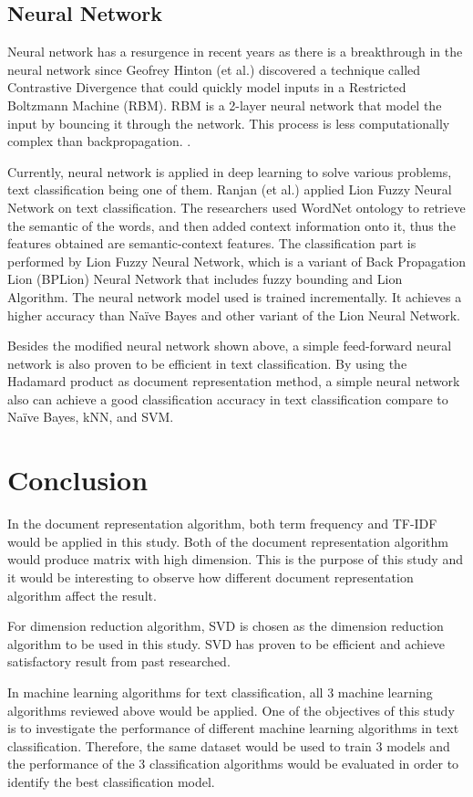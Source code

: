 \clearpage
\subsection{Neural Network}
Neural network has a resurgence in recent years as there is a breakthrough in the neural network since Geofrey Hinton (et al.) discovered a technique called Contrastive Divergence that could quickly model inputs in a Restricted Boltzmann Machine (RBM). RBM is a 2-layer neural network that model the input by bouncing it through the network. This process is less computationally complex than backpropagation. \cite{nnHinton}.
	
Currently, neural network is applied in deep learning to solve various problems, text classification being one of them. Ranjan (et al.) applied Lion Fuzzy Neural Network on text classification. The researchers used WordNet ontology to retrieve the semantic of the words, and then added context information onto it, thus the features obtained are semantic-context features. The classification part is performed by Lion Fuzzy Neural Network, which is a variant of Back Propagation Lion (BPLion) Neural Network that includes fuzzy bounding and Lion Algorithm. The neural network model used is trained incrementally. It achieves a higher accuracy than Naïve Bayes and other variant of the Lion Neural Network. \cite{lionNn}
	
Besides the modified neural network shown above, a simple feed-forward neural network is also proven to be efficient in text classification. By using the Hadamard product as document representation method, a simple neural network also can achieve a good classification accuracy in text classification compare to Naïve Bayes, kNN, and SVM. \cite{oneNn}\\
	
\clearpage
\section{Conclusion}
In the document representation algorithm, both term frequency and TF-IDF would be applied in this study. Both of the document representation algorithm would produce matrix with high dimension. This is the purpose of this study and it would be interesting to observe how different document representation algorithm affect the result.

For dimension reduction algorithm, SVD is chosen as the dimension reduction algorithm to be used in this study. SVD has proven to be efficient and achieve satisfactory result from past researched.
	
In machine learning algorithms for text classification, all 3 machine learning algorithms reviewed above would be applied. One of the objectives of this study is to investigate the performance of different machine learning algorithms in text classification. Therefore, the same dataset would be used to train 3 models and the performance of the 3 classification algorithms would be evaluated in order to identify the best classification model.
